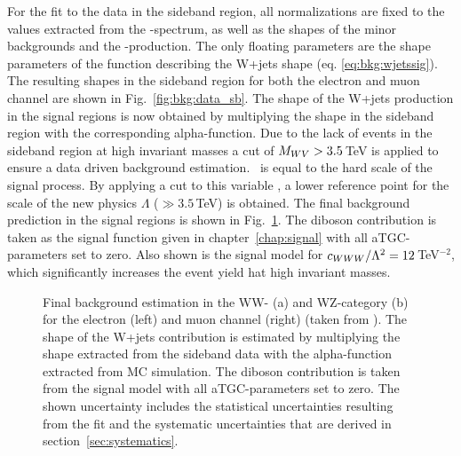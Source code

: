 \noindent For the fit to the data in the sideband region, all normalizations are fixed to the values extracted from the \Mpr -spectrum, as well as the shapes of the minor backgrounds and the \ttbar -production. The only floating parameters are the shape parameters of the function describing the W+jets shape (eq. \ref{eq:bkg:wjetssig}). The resulting shapes in the sideband region for both the electron and muon channel are shown in Fig.~\ref{fig:bkg:data_sb}. The shape of the W+jets production in the signal regions is now obtained by multiplying the shape in the sideband region with the corresponding alpha-function. Due to the lack of events in the sideband region at high invariant masses a cut of $M_{WV} > 3.5$\,TeV is applied to ensure a data driven background estimation. \MWV \ is equal to the hard scale of the signal process. By applying a cut to this variable , a lower reference point for the scale of the new physics $\Lambda$ ($\gg3.5$\,TeV) is obtained. The final background prediction in the signal regions is shown in Fig.~\ref{fig:bkg:mwv_final}. The diboson contribution is taken as the signal function given in chapter~\ref{chap:signal} with all aTGC-parameters set to zero. Also shown is the signal model for $c_{WWW}/\Lambda^2 = 12$\,TeV$^{-2}$, which significantly increases the event yield hat high invariant masses.
 \begin{figure}
	\centering
	\caption[Final background estimation in the WW- and WZ-category for the electron and muon channel]{Final background estimation in the WW- (a) and WZ-category (b) for the electron (left) and muon channel (right) (taken from \cite{PAS}). The shape of the W+jets contribution is estimated by multiplying the shape extracted from the sideband data with the alpha-function extracted from MC simulation. The diboson contribution is taken from the signal model with all aTGC-parameters set to zero. The shown uncertainty includes the statistical uncertainties resulting from the fit and the systematic uncertainties that are derived in section~\ref{sec:systematics}.}
	\label{fig:bkg:mwv_final}
\end{figure}


